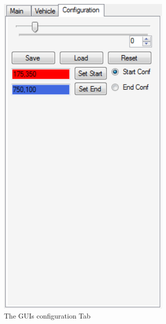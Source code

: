 \begin{figure}[b]
\centering
\includegraphics[width=0.75\textwidth]{./Chapters/Figures/gui_configuration.png}
\caption{The GUIs configuration Tab\label{pic:gui_configuration}}
\end{figure}

